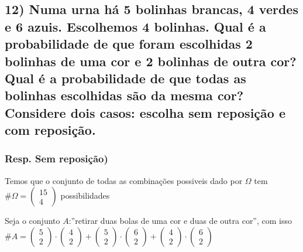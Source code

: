 \documentclass[english]{article}
\begin{document}
\textbf{\textcompwordmark{}}


\subsection*{\textmd{12) Numa urna há 5 bolinhas brancas, 4 verdes e 6 azuis.
Escolhemos 4 bolinhas. Qual é a probabilidade de que foram escolhidas
2 bolinhas de uma cor e 2 bolinhas de outra cor? Qual é a probabilidade
de que todas as bolinhas escolhidas são da mesma cor? Considere dois
casos: escolha sem reposição e com reposição.}}


\subsubsection*{\textmd{Resp. Sem reposição)}}

Temos que o conjunto de todas as combinações possiveis dado por $\Omega$
tem $\#\Omega=\left(\begin{array}{c}
15\\
4
\end{array}\right)$ possibilidades

Seja o conjunto $A$:''retirar duas bolas de uma cor e duas de outra
cor'', com isso $\#A=\left(\begin{array}{c}
5\\
2
\end{array}\right)\cdot\left(\begin{array}{c}
4\\
2
\end{array}\right)+\left(\begin{array}{c}
5\\
2
\end{array}\right)\cdot\left(\begin{array}{c}
6\\
2
\end{array}\right)+\left(\begin{array}{c}
4\\
2
\end{array}\right)\cdot\left(\begin{array}{c}
6\\
2
\end{array}\right)$
\end{document}
